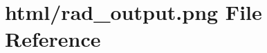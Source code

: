 \hypertarget{html_2rad__output_8png}{}\section{html/rad\+\_\+output.png File Reference}
\label{html_2rad__output_8png}

